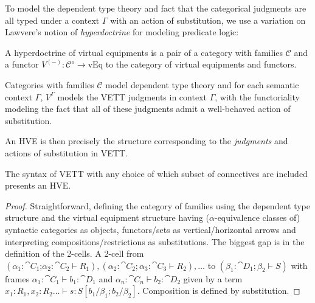 \documentclass{llncs}
\begin{document}
To model the dependent type theory and fact that the categorical
judgments are all typed under a context $\Gamma$ with an action of
substitution, we use a variation on Lawvere's notion of
\emph{hyperdoctrine} for modeling predicate logic\cite{Lawvere69}:
\begin{definition}
  A hyperdoctrine of virtual equipments is a pair of a category with
  families $\mathcal C$ and a functor $V^{(-)} : \mathcal C^o \to
  \text{vEq}$ to the category of virtual equipments and functors.
\end{definition}
Categories with families $\mathcal C$ model dependent type theory
\citep{cwf} and for each semantic context $\Gamma$, $V^\Gamma$ models
the VETT judgments in context $\Gamma$, with the functoriality
modeling the fact that all of these judgments admit a well-behaved
action of substitution.

An HVE is then precisely the structure corresponding to the
\emph{judgments} and actions of substitution in VETT.
\begin{construction}
  \label{cons:syn-model}
  The syntax of VETT with any choice of which subset of connectives
  are included presents an HVE.
\end{construction}
\begin{proof}
  Straightforward, defining the category of families using the dependent
  type structure and the virtual equipment structure having
  ($\alpha$-equivalence classes of) syntactic categories as objects,
  functors/sets as vertical/horizontal arrows and interpreting
  compositions/restrictions as substitutions.  The biggest gap is in the
  definition of the 2-cells.  A 2-cell from\\ $(\alpha_1:\cat
  C_1\mathord{;}\alpha_2:\cat C_2\vdash R_1),(\alpha_2:\cat
  C_2;\alpha_3:\cat C_3 \vdash R_2),\ldots$ to $(\beta_1:\cat
  D_1;\beta_2\vdash S)$ with frames $\alpha_1:\cat C_1\vdash b_1 : \cat
  D_1$ and $\alpha_n:\cat C_n\vdash b_2 : \cat D_2$ given by a term
  $x_1:R_1,x_2:R_2\ldots \vdash s :
  S[b_1/\beta_1;b_2/\beta_2]$. Composition is defined by substitution.
\end{proof}
\end{document}
